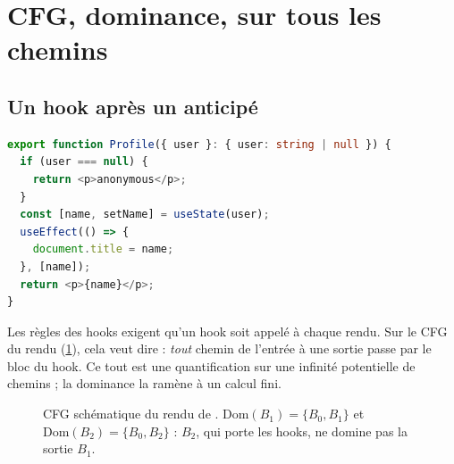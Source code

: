 \section{CFG, dominance, \og sur tous les chemins\fg{}}
\label{sec:interpretation-abstraite-dominance}

\subsection{Un hook après un  anticipé}

\begin{lstlisting}[language=TypeScript,caption={Un hook sauté par un \code{return} anticipé (\file{/tmp/ch03/hook.tsx}, élagué de sa ligne d'import)},label={lst:interpretation-abstraite-hook}]
export function Profile({ user }: { user: string | null }) {
  if (user === null) {
    return <p>anonymous</p>;
  }
  const [name, setName] = useState(user);
  useEffect(() => {
    document.title = name;
  }, [name]);
  return <p>{name}</p>;
}
\end{lstlisting}


Les règles des hooks exigent qu'un hook soit appelé à chaque rendu. Sur le CFG
du rendu (\cref{fig:interpretation-abstraite-cfg-hook}), cela veut dire :
\emph{tout} chemin de l'entrée à une sortie passe par le bloc du hook. Ce
\og tout\fg{} est une quantification sur une infinité potentielle de chemins ;
la dominance la ramène à un calcul fini.

\begin{figure}[htbp]\centering
{}
\caption{CFG schématique du rendu de . $\mathrm{Dom}(B_1) = \{B_0,
B_1\}$ et $\mathrm{Dom}(B_2) = \{B_0, B_2\}$ : $B_2$, qui porte les hooks, ne
domine pas la sortie $B_1$.}
\label{fig:interpretation-abstraite-cfg-hook}
\end{figure}

